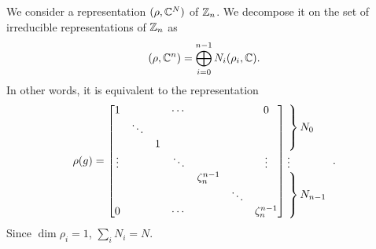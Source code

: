         We consider a representation $(\rho,\mathbb{C}^N)$ of $\mathbb{Z}_n$. We decompose it on the set of irreducible representations of $\mathbb{Z}_n$ as
        \begin{equation}
            (\rho,\mathbb{C}^n)=\bigoplus^{n-1}_{i=0}N_i(\rho_i,\mathbb{C}).
        \end{equation}
        In other words, it is equivalent to the representation
        \begin{equation}
            \rho(g)=
            \begin{bmatrix}
                1 & & & \cdots & & & 0 \\
                & \ddots & & & & & \\
                & & 1 & & & &  \\
                \vdots & & & \ddots & & & \vdots \\
                & & & & \zeta^{n-1}_n & & \\
                & & & & & \ddots & \\
                0 & & & \cdots & & & \zeta^{n-1}_n 
            \end{bmatrix}
            \hspace{-0.2cm}
            \begin{tabular}{l}
            $\left.\lefteqn{\phantom{
                \begin{matrix}
                    a_0\\ \ddots\\ a_0\ 
                \end{matrix} 
            }}\right\}N_0$\\
            \vdots \\
            $\left.\lefteqn{\phantom{
                \begin{matrix}
                    b_0\\ \ddots\\ b_0\ 
                \end{matrix}
            }} \right\}N_{n-1}$
            \end{tabular}.\label{eq:reprrhoZn}
        \end{equation}
        Since $\dim\rho_i=1$, $\sum_i N_i=N$. 

